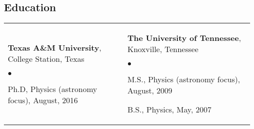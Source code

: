 \documentclass[margin,line, 11pt]{res}
\newenvironment{list2}{
  \begin{list}{$\bullet$}{%
      \setlength{\itemsep}{0in}
      \setlength{\parsep}{0in} \setlength{\parskip}{0in}
      \setlength{\topsep}{0in} \setlength{\partopsep}{0in}
      \setlength{\leftmargin}{0.2in}}}{\end{list}}
\begin{document}
\begin{resume}

\section{Education}
\begin{tabular}{@{}p{3in}p{3in}}
  \textbf{Texas A\&M University}, College Station, Texas
  \begin{list2}
  	\item Ph.D, Physics (astronomy focus), August, 2016
  \end{list2} &
  \textbf{The University of Tennessee}, Knoxville, Tennessee
  \begin{list2}
  	\item M.S., Physics (astronomy focus),  August, 2009
  	\item B.S., Physics,  May, 2007
  \end{list2} \\
\end{tabular}
\vspace*{-4mm}

\end{resume}
\end{document}
